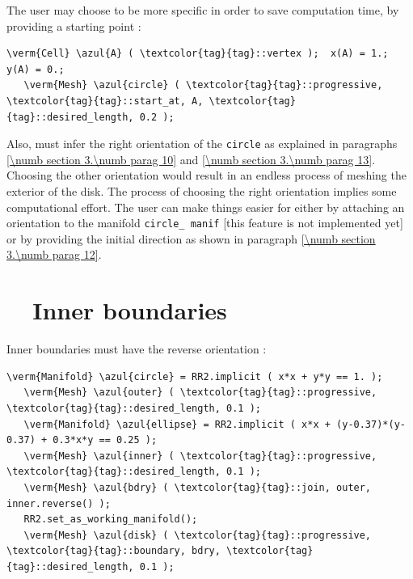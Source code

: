 The user may choose to be more specific in order to save computation time,
by providing a starting point :

\begin{Verbatim}[commandchars=\\\{\},formatcom=\small\tt,
   baselinestretch=0.94,framesep=2mm                      ]
   \verm{Cell} \azul{A} ( \textcolor{tag}{tag}::vertex );  x(A) = 1.;  y(A) = 0.;
   \verm{Mesh} \azul{circle} ( \textcolor{tag}{tag}::progressive, \textcolor{tag}{tag}::start_at, A, \textcolor{tag}{tag}::desired_length, 0.2 );
\end{Verbatim}

Also, {\maniFEM} must infer the right orientation of the {\small\tt circle}
as explained in paragraphs \ref{\numb section 3.\numb parag 10} and
\ref{\numb section 3.\numb parag 13}.
Choosing the other orientation would result in an endless process of meshing the exterior of
the disk.
The process of choosing the right orientation implies some computational effort.
The user can make things easier for {\maniFEM} either by attaching an orientation
to the manifold {\small\tt circle\_\,manif} [this feature is not implemented yet] or
by providing the initial direction as shown in paragraph \ref{\numb section 3.\numb parag 12}.


\section{~~Inner boundaries}\label{\numb section 3.\numb parag 3}

Inner boundaries must have the reverse orientation :

\begin{Verbatim}[commandchars=\\\{\},formatcom=\small\tt,frame=single,
   label=parag-\ref{\numb section 3.\numb parag 3}.cpp,rulecolor=\color{coment},
   baselinestretch=0.94,framesep=2mm                                            ]
   \verm{Manifold} \azul{circle} = RR2.implicit ( x*x + y*y == 1. );
   \verm{Mesh} \azul{outer} ( \textcolor{tag}{tag}::progressive, \textcolor{tag}{tag}::desired_length, 0.1 );
   \verm{Manifold} \azul{ellipse} = RR2.implicit ( x*x + (y-0.37)*(y-0.37) + 0.3*x*y == 0.25 );
   \verm{Mesh} \azul{inner} ( \textcolor{tag}{tag}::progressive, \textcolor{tag}{tag}::desired_length, 0.1 );
   \verm{Mesh} \azul{bdry} ( \textcolor{tag}{tag}::join, outer, inner.reverse() );
   RR2.set_as_working_manifold();
   \verm{Mesh} \azul{disk} ( \textcolor{tag}{tag}::progressive, \textcolor{tag}{tag}::boundary, bdry, \textcolor{tag}{tag}::desired_length, 0.1 );
\end{Verbatim}

